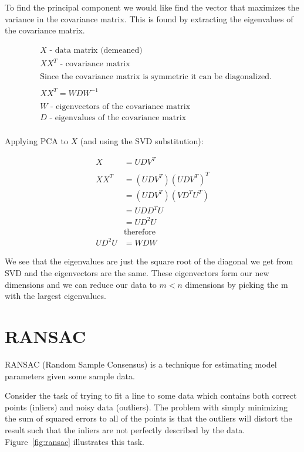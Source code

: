 To find the principal component we would like find the vector that maximizes the variance in the covariance matrix. This is found by extracting the eigenvalues of the covariance matrix.

\begin{align*}
& X \text{ - data matrix (demeaned)} \\
& XX^{T} \text{ - covariance matrix} \\
& \\
& \text{Since the covariance matrix is symmetric it can be diagonalized.} \\
& \\
& XX^{T} = WDW^{-1} \\
& \\
& W \text{ - eigenvectors of the covariance matrix} \\
& D \text{ - eigenvalues of the covariance matrix} \\
\end{align*}

Applying PCA to $X$ (and using the SVD substitution):

\begin{align*}
X &= UDV^T \\
& \\
XX^T &= (UDV^T)(UDV^T)^T \\
	&= (UDV^T)(VD^TU^T) \\
	&= UDD^TU \\
	&= UD^{2}U \\
	& \text{therefore} \\
UD^{2}U &= WDW
\end{align*}

We see that the eigenvalues are just the square root of the diagonal we get from SVD and the eigenvectors are the same. These eigenvectors form our new dimensions and we can reduce our data to $m < n$ dimensions by picking the m with the largest eigenvalues.

\newpage
\section{RANSAC}\label{background:ransac}
RANSAC (Random Sample Consensus) is a technique for estimating model parameters given some sample data.

Consider the task of trying to fit a line to some data which contains both correct points (inliers) and noisy data (outliers). The problem with simply minimizing the sum of squared errors to all of the points is that the outliers will distort the result such that the inliers are not perfectly described by the data. Figure~\ref{fig:ransac} illustrates this task.


